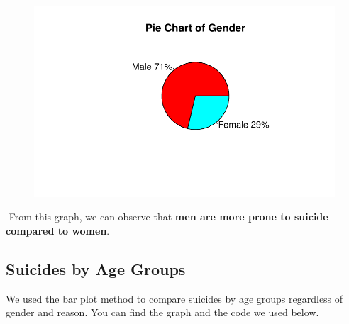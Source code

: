 \documentclass[
  11pt,
  a4paper,
  DIV=11,
  numbers=noendperiod]{scrartcl}
\begin{document}
\begin{figure}[H]

{\centering \includegraphics{analysis_files/figure-pdf/unnamed-chunk-4-1.pdf}

}

\end{figure}

-From this graph, we can observe that \textbf{men are more prone to
suicide compared to women}.

\hypertarget{suicides-by-age-groups}{%
\subsection{\texorpdfstring{\textbf{Suicides by Age
Groups}}{Suicides by Age Groups}}\label{suicides-by-age-groups}}

We used the bar plot method to compare suicides by age groups regardless
of gender and reason. You can find the graph and the code we used below.
\end{document}
